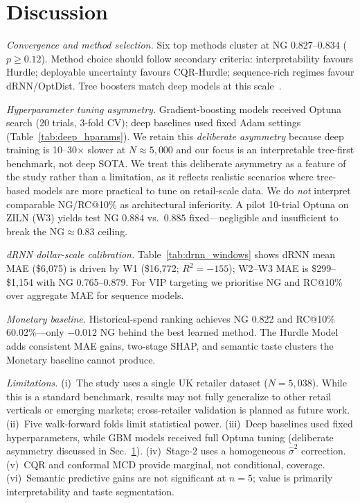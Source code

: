 \documentclass[pdflatex,sn-mathphys-num]{sn-jnl}
\theoremstyle{thmstyleone}
\theoremstyle{thmstyletwo}
\theoremstyle{thmstylethree}
\begin{document}
\section{Discussion}\label{sec:discussion}

\textit{Convergence and method selection.} Six top methods cluster at
NG 0.827--0.834 ($p\geq 0.12$). Method choice should follow secondary
criteria: interpretability favours Hurdle; deployable uncertainty favours
CQR-Hurdle; sequence-rich regimes favour dRNN/OptDist. Tree boosters match
deep models at this scale~\cite{grinsztajn2022treesvsnn}.

\textit{Hyperparameter tuning asymmetry.} Gradient-boosting models
received Optuna search (20 trials, 3-fold CV); deep baselines used
fixed Adam settings (Table~\ref{tab:deep_hparams}). We retain this
\emph{deliberate asymmetry} because deep training is 10--30$\times$
slower at $N{\approx}5{,}000$ and our focus is an interpretable
tree-first benchmark, not deep SOTA. We treat this deliberate
asymmetry as a feature of the study rather than a limitation, as it
reflects realistic scenarios where tree-based models are more
practical to tune on retail-scale data. We do \emph{not} interpret
comparable NG/RC@10\% as architectural inferiority. A pilot 10-trial
Optuna on ZILN (W3) yields test NG $0.884$ vs.\ $0.885$ fixed---negligible
and insufficient to break the NG${\approx}0.83$ ceiling.

\textit{dRNN dollar-scale calibration.} Table~\ref{tab:drnn_windows}
shows dRNN mean MAE (\$6{,}075) is driven by W1 (\$16{,}772;
$R^2{=}{-}155$); W2--W3 MAE is \$299--\$1{,}154 with NG
0.765--0.879. For VIP targeting we prioritise NG and RC@10\% over
aggregate MAE for sequence models.

\textit{Monetary baseline.} Historical-spend ranking achieves NG 0.822
and RC@10\% 60.02\%---only $-0.012$ NG behind the best learned method.
The Hurdle Model adds consistent MAE gains, two-stage SHAP, and semantic
taste clusters the Monetary baseline cannot produce.

\textit{Limitations.} (i)~The study uses a single UK retailer dataset
($N{=}5{,}038$). While this is a standard benchmark, results may not
fully generalize to other retail verticals or emerging markets;
cross-retailer validation is planned as future work.
(ii)~Five walk-forward folds limit statistical power.
(iii)~Deep baselines used fixed hyperparameters, while GBM models received
full Optuna tuning (deliberate asymmetry discussed in
Sec.~\ref{sec:discussion}).
(iv)~Stage-2 uses a homogeneous $\hat\sigma^2$ correction.
(v)~CQR and conformal MCD provide marginal, not conditional, coverage.
(vi)~Semantic predictive gains are not significant at $n{=}5$; value is
primarily interpretability and taste segmentation.
\end{document}
